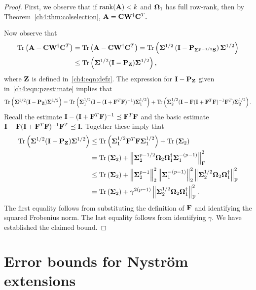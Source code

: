 \begin{proof}
First, we observe that if $\mathrm{rank}(\mathbf{A}) < k$ and $\mathbf{\Omega}_1$ has full row-rank, then by Theorem~\ref{ch4:thm:colselection},
$\mathbf{A} = \mathbf{C}\mathbf{W}^\dagger \mathbf{C}^T.$

Now observe that 
\begin{align*}
\operatorname{Tr}\left(\mathbf{A} - \mathbf{C} \mathbf{W}^\dagger \mathbf{C}^T\right) & = 
  \operatorname{Tr}\left(\mathbf{A} - \mathbf{C} \mathbf{W}^\dagger \mathbf{C}^T\right) 
     = \operatorname{Tr}\left(\mathbf{\Sigma}^{1/2}
       \left(\mathbf{I} - \mathbf{P}_{\mathbf{\Sigma}^{p-1/2}\mathbf{S}}\right) \mathbf{\Sigma}^{1/2} \right) \\
   & \leq \operatorname{Tr}\left(\mathbf{\Sigma}^{1/2}(\mathbf{I} - \mathbf{P}_{\mathbf{Z}}) \mathbf{\Sigma}^{1/2}\right),
\end{align*}
where $\mathbf{Z}$ is defined in~\eqref{ch4:eqn:defz}.
The expression for $\mathbf{I} - \mathbf{P}_{\mathbf{Z}}$ given in~\eqref{ch4:eqn:pzestimate} implies that 
\[
   \operatorname{Tr}\left(\mathbf{\Sigma}^{1/2}(\mathbf{I} - \mathbf{P}_{\mathbf{Z}}) \mathbf{\Sigma}^{1/2}\right) =
   \operatorname{Tr}\left(\mathbf{\Sigma}_1^{1/2} 
        (\mathbf{I} - (\mathbf{I} + \mathbf{F}^T \mathbf{F})^{-1})
       \mathbf{\Sigma}_1^{1/2}\right) + 
   \operatorname{Tr}\left(\mathbf{\Sigma}_2^{1/2} 
        (\mathbf{I} - \mathbf{F} (\mathbf{I} + \mathbf{F}^T \mathbf{F})^{-1} \mathbf{F}^T) 
       \mathbf{\Sigma}_2^{1/2}\right).
\]
Recall the estimate 
$\mathbf{I} - (\mathbf{I} + \mathbf{F}^T \mathbf{F})^{-1} \preceq \mathbf{F}^T \mathbf{F}$
and the basic estimate 
$\mathbf{I} - 
 \mathbf{F} (\mathbf{I} + \mathbf{F}^T \mathbf{F})^{-1} \mathbf{F}^T \preceq \mathbf{I}.$ 
Together these imply that 
\begin{align*}
\operatorname{Tr}\left(\mathbf{\Sigma}^{1/2}(\mathbf{I} - \mathbf{P}_{\mathbf{Z}}) \mathbf{\Sigma}^{1/2}\right) 
   & \leq \operatorname{Tr}\left(\mathbf{\Sigma}_1^{1/2} \mathbf{F}^T \mathbf{F} \mathbf{\Sigma}_1^{1/2} \right) + 
     \operatorname{Tr}\left(\mathbf{\Sigma}_2\right) \\
   & = \operatorname{Tr}\left(\mathbf{\Sigma}_2\right) + 
       \left\|\mathbf{\Sigma}_2^{p-1/2} 
               \mathbf{\Omega}_2 \mathbf{\Omega}_1^\dagger \mathbf{\Sigma}_1^{-(p-1)}\right\|_\mathrm{F}^2 \\
   & \leq \operatorname{Tr}\left(\mathbf{\Sigma}_2\right) + 
          \left\|\mathbf{\Sigma}_2^{p-1}\right\|_2^2 \left\|\mathbf{\Sigma}_1^{-(p-1)}\right\|_2^2 
          \left\|\mathbf{\Sigma}_2^{1/2} \mathbf{\Omega}_2 \mathbf{\Omega}_1^\dagger\right\|_\mathrm{F}^2 \\
   & = \operatorname{Tr}\left(\mathbf{\Sigma}_2\right) + 
       \gamma^{2(p-1)} \left\|\mathbf{\Sigma}_2^{1/2} \mathbf{\Omega}_2 \mathbf{\Omega}_1^\dagger\right\|_\mathrm{F}^2.
\end{align*}
The first equality follows from substituting the definition of $\mathbf{F}$ and 
identifying the squared Frobenius norm. The last equality follows from 
identifying $\gamma.$ We have established the claimed bound.

\end{proof}

\section{Error bounds for Nystr\"om extensions}
\label{ch4:sec:nystromextensions}

